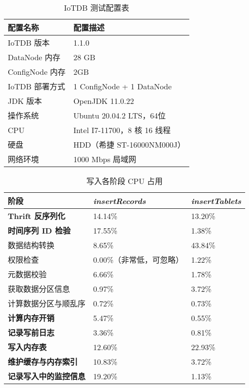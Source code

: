 \begin{table}
  \caption{IoTDB 测试配置表}
  \centering
  \begin{tabular}{ll}
  \toprule
  配置名称 & 配置描述 \\
  \midrule
      IoTDB 版本 &  1.1.0 \\ 
      DataNode 内存 & 28 GB \\ 
      ConfigNode 内存 & 2GB \\ 
      IoTDB 部署方式 & 1 ConfigNode + 1 DataNode \\
      JDK 版本 & OpenJDK 11.0.22 \\
      操作系统 & Ubuntu 20.04.2 LTS，64位 \\
      CPU &  Intel I7-11700，8 核 16 线程 \\ 
      硬盘 & HDD（希捷 ST-16000NM000J） \\ 
      网络环境 & 1000 Mbps 局域网 \\
  \bottomrule
  \end{tabular}
  \label{tabular:insert-records-profile-iotdb-config}
\end{table}

\begin{table}
  \caption{写入各阶段 CPU 占用}
  \centering
  \begin{tabular}{lll}
  \toprule
  阶段 &  \emph{insertRecords} & \emph{insertTablets} \\
  \midrule
      \textbf{Thrift 反序列化} &  14.14\% & 13.20\% \\ 
      \textbf{时间序列 ID 检验} & 17.55\% & 1.38\% \\ 
      数据结构转换 &  8.65\% & 43.84\% \\ 
       权限检查 & 0.00\%（非常低，可忽略） &  1.22\%\\ 
      元数据校验 &  6.66\% & 1.78\% \\ 
      获取数据分区信息 &  0.97\% & 3.72\% \\
      计算数据分区与顺乱序 &  0.72\%&  0.73\%  \\
      \textbf{计算内存开销} & 5.47\% & 0.55\% \\
      \textbf{记录写前日志} & 3.36\% & 0.81\%\\
      \textbf{写入内存表} & 12.60\% & 22.93\% \\
      \textbf{维护缓存与内存索引} & 10.83\% & 3.72\% \\
      \textbf{记录写入中的监控信息} & 19.20\% & 1.13\%\\
  \bottomrule
  \end{tabular}
  \label{tabular:insert-records-profile-result}
\end{table}


